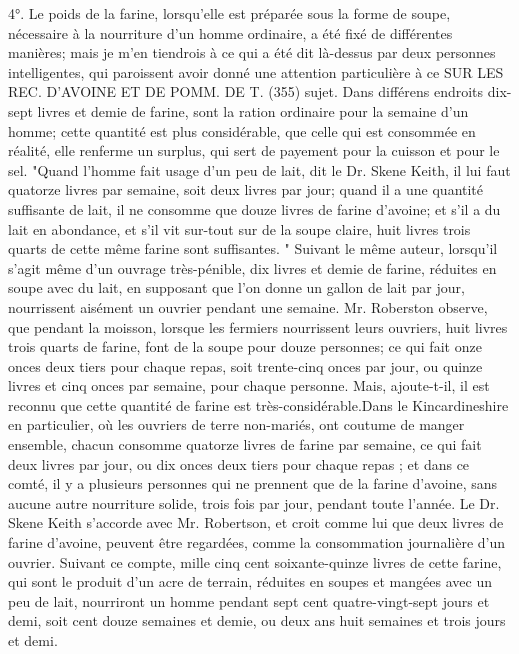 4°. Le poids de la farine, lorsqu'elle est préparée sous la forme de soupe, nécessaire à la nourriture d'un homme ordinaire, a été fixé de différentes manières; mais je m'en tiendrois à ce qui a été dit là-dessus par deux personnes intelligentes, qui paroissent avoir donné une attention particulière à ce\setcounter{page}{355} SUR LES REC. D'AVOINE ET DE POMM. DE T. (355) sujet. Dans différens endroits dix-sept livres et demie de farine, sont la ration ordinaire pour la semaine d'un homme; cette quantité est plus considérable, que celle qui est consommée en réalité, elle renferme un surplus, qui sert de payement pour la cuisson et pour le sel. "Quand l'homme fait usage d'un peu de lait, dit le Dr. Skene Keith, il lui faut quatorze livres par semaine, soit deux livres par jour; quand il a une quantité suffisante de lait, il ne consomme que douze livres de farine d'avoine; et s'il a du lait en abondance, et s'il vit sur-tout sur de la soupe claire, huit livres trois quarts de cette même farine sont suffisantes. " Suivant le même auteur, lorsqu'il s'agit même d'un ouvrage très-pénible, dix livres et demie de farine, réduites en soupe avec du lait, en supposant que l'on donne un gallon de lait par jour, nourrissent aisément un ouvrier pendant une semaine. Mr. Roberston observe, que pendant la moisson, lorsque les fermiers nourrissent leurs ouvriers, huit livres trois quarts de farine, font de la soupe pour douze personnes; ce qui fait onze onces deux tiers pour chaque repas, soit trente-cinq onces par jour, ou quinze livres et cinq onces par semaine, pour chaque personne. Mais, ajoute-t-il, il est\setcounter{page}{356} reconnu que cette quantité de farine est très-considérable.Dans le Kincardineshire en particulier, où les ouvriers de terre non-mariés, ont coutume de manger ensemble, chacun consomme quatorze livres de farine par semaine, ce qui fait deux livres par jour, ou dix onces deux tiers pour chaque repas ; et dans ce comté, il y a plusieurs personnes qui ne prennent que de la farine d'avoine, sans aucune autre nourriture solide, trois fois par jour, pendant toute l'année. Le Dr. Skene Keith s'accorde avec Mr. Robertson, et croit comme lui que deux livres de farine d'avoine, peuvent être regardées, comme la consommation journalière d'un ouvrier.
Suivant ce compte, mille cinq cent soixante-quinze livres de cette farine, qui sont le produit d'un acre de terrain, réduites en soupes et mangées avec un peu de lait, nourriront un homme pendant sept cent quatre-vingt-sept jours et demi, soit cent douze semaines et demie, ou deux ans huit semaines et trois jours et demi.
